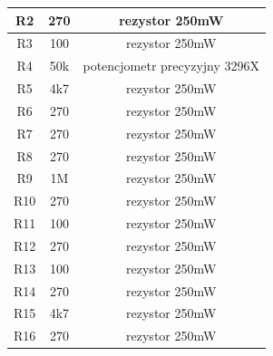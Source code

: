\documentclass[12pt]{article}
\begin{document}
\begin{minipage}[c]{0.45\linewidth}
\begin{tabular}{|c|c|c|}
R2 & 270 & rezystor 250mW \\
\hline
R3 & 100 & rezystor 250mW \\
\hline
R4 & 50k & potencjometr precyzyjny 3296X \\
\hline
R5 & 4k7 & rezystor 250mW \\
\hline
R6 & 270 & rezystor 250mW \\
\hline
R7 & 270 & rezystor 250mW \\
\hline
R8 & 270 & rezystor 250mW \\
\hline
R9 & 1M & rezystor 250mW \\
\hline
R10 & 270 & rezystor 250mW \\
\hline
R11 & 100 & rezystor 250mW \\
\hline
R12 & 270 & rezystor 250mW \\
\hline
R13 & 100 & rezystor 250mW \\
\hline
R14 & 270 & rezystor 250mW \\
\hline
R15 & 4k7 & rezystor 250mW \\
\hline
R16 & 270 & rezystor 250mW \\
\hline
\end{tabular}
\end{minipage}
\end{document}
